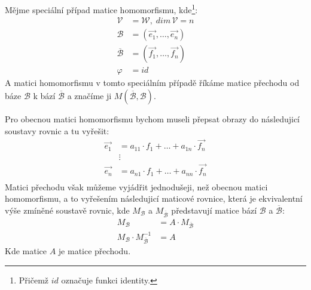 \begin{definition}
    Mějme speciální případ matice homomorfismu, kde\footnote{Přičemž $id$ označuje funkci identity.}:
    \begin{align*}
        \mathcal{V} & = \mathcal{W}, \; dim\,\mathcal{V} = n\\
        \mathcal{B} &= (\vec{e_1}, \ldots, \vec{e_n})\\
        \overline{\mathcal{B}} &= (\vec{f_1}, \ldots, \vec{f_n})\\
        \varphi &= id
    \end{align*}
    A matici homomorfismu v tomto speciálním případě říkáme matice přechodu od
    báze $\mathcal{B}$ k bází $\overline{\mathcal{B}}$ a značíme ji $M(\overline{\mathcal{B}}, \mathcal{B})$.
\end{definition}

Pro obecnou matici homomorfismu bychom museli přepsat obrazy do následujicí soustavy
rovnic a tu vyřešit:
\begin{align*}
    \vec{e_1} &= a_{11} \cdot f_1 + \ldots + a_{1n} \cdot \vec{f_n}\\
    &\vdots \\
    \vec{e_n} &= a_{n1} \cdot f_1 + \ldots + a_{nn} \cdot \vec{f_n}\\
\end{align*}
Matici přechodu však můžeme vyjádřit jednodušeji, než obecnou matici homomorfismu,
a to vyřešením následujicí maticové rovnice, která je ekvivalentní výše zmíněné soustavě
rovnic, kde $M_{\mathcal{B}}$ a $M_{\overline{\mathcal{B}}}$ představují matice bází $\mathcal{B}$
a $\overline{\mathcal{B}}$:
\begin{align*}
    M_{\mathcal{B}} &= A \cdot M_{\overline{\mathcal{B}}}\\
    M_{\mathcal{B}} \cdot M_{\overline{\mathcal{B}}}^{-1} &= A
\end{align*}
Kde matice $A$ je matice přechodu.


